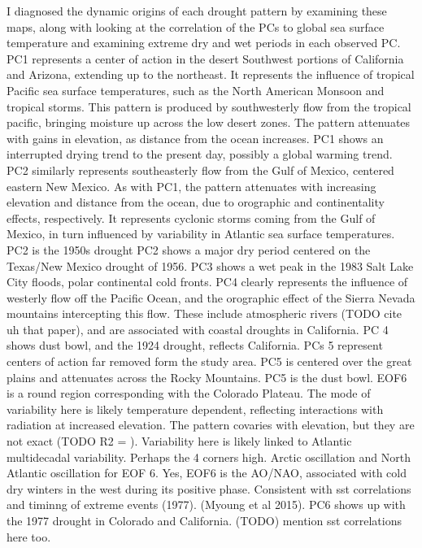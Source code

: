 \documentclass[11pt]{wlscirep}
\begin{document}
I diagnosed the dynamic origins of each drought pattern by examining these maps, along with looking at the correlation of the PCs to global sea surface temperature and examining extreme dry and wet periods in each observed PC.
PC1 represents a center of action in the desert Southwest portions of California and Arizona, extending up to the northeast. It represents the influence of tropical Pacific sea surface temperatures, such as the North American Monsoon and tropical storms. This pattern is produced by southwesterly flow from the tropical pacific, bringing moisture up across the low desert zones. The pattern attenuates with gains in elevation, as distance from the ocean increases. PC1 shows an interrupted drying trend to the present day, possibly a global warming trend. PC2 similarly represents southeasterly flow from the Gulf of Mexico, centered eastern New Mexico. As with PC1, the pattern attenuates with increasing elevation and distance from the ocean, due to orographic and continentality effects, respectively. It represents cyclonic storms coming from the Gulf of Mexico, in turn influenced by variability in Atlantic sea surface temperatures. PC2 is the 1950s drought PC2 shows a major dry period centered on the Texas/New Mexico drought of 1956. PC3 shows a wet peak in the 1983 Salt Lake City floods, polar continental cold fronts. PC4 clearly represents the influence of westerly flow off the Pacific Ocean, and the orographic effect of the Sierra Nevada mountains intercepting this flow. These include atmospheric rivers (TODO cite uh that paper), and are associated with coastal droughts in California. PC 4 shows dust bowl, and the 1924 drought, reflects California. PCs 5 represent centers of action far removed form the study area. PC5 is centered over the great plains and attenuates across the Rocky Mountains. PC5 is the dust bowl. EOF6 is a round region corresponding with the Colorado Plateau. The mode of variability here is likely temperature dependent, reflecting interactions with radiation at increased elevation. The pattern covaries with elevation, but they are not exact (TODO R2 = ). Variability here is likely linked to Atlantic multidecadal variability. Perhaps the 4 corners high. Arctic oscillation and North Atlantic oscillation for EOF 6. Yes, EOF6 is the AO/NAO, associated with cold dry winters in the west during its positive phase. Consistent with sst correlations and timinng of extreme events (1977). (Myoung et al 2015). PC6 shows up with the 1977 drought in Colorado and California. (TODO) mention sst correlations here too.
\end{document}

